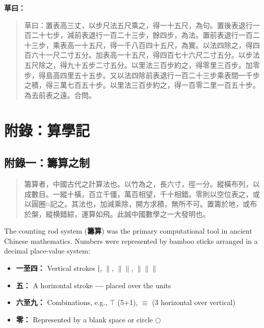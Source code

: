 \documentclass[11pt,a4paper]{article}
\begin{document}
\noindent\textbf{草曰：}
\begin{quote}
\textcolor{chinacolor}{%
草曰：置表高三丈，以步尺法五尺乘之，得一十五尺，為句。置後表退行一百二十七步，減前表退行一百二十三步，餘四步，為法。置前表退行一百二十三步，乘表高一十五尺，得一千八百四十五尺，為實。以法四除之，得四百六十一尺二寸五分。加表高一十五尺，得四百七十六尺二寸五分。以步法五尺除之，得九十五步二寸五分。以里法三百步約之，得零里三百步。加零步，得島高四里五十五步。又以法四除前表退行一百二十三步乘表間一千步之積，得三萬七百五十步。以里法三百步約之，得一百零二里一百五十步。為去前表之遠。合問。
}
\end{quote}

\newpage

\section*{附錄：算學記}

\subsection*{附錄一：籌算之制}

\begin{quote}
\textcolor{chinacolor}{%
籌算者，中國古代之計算法也。以竹為之，長六寸，徑一分。縱橫布列，以成數目。一縱十橫，百立千僵，萬百相望，千十相錯。零則以空位表之，或以圓圈○記之。其法也，加減乘除，開方求積，無所不可。置籌於地，或布於槃，縱横錯綜，運算如飛。此誠中國數學之一大發明也。
}
\end{quote}

The counting rod system (\textbf{籌算}) was the primary computational tool in 
ancient Chinese mathematics. Numbers were represented by bamboo sticks 
arranged in a decimal place-value system:

\begin{itemize}
  \item \textbf{一至四：} Vertical strokes \textbf{|}, $\|$, 
    $\|$$\|$, $\|$$\|$$\|$ 
  \item \textbf{五：} A horizontal stroke \textbf{—} placed over the units
  \item \textbf{六至九：} Combinations, e.g., $\top$ (5+1), 
    $\equiv$ (3 horizontal over vertical)
  \item \textbf{零：} Represented by a blank space or circle $\bigcirc$
\end{itemize}
\end{document}
